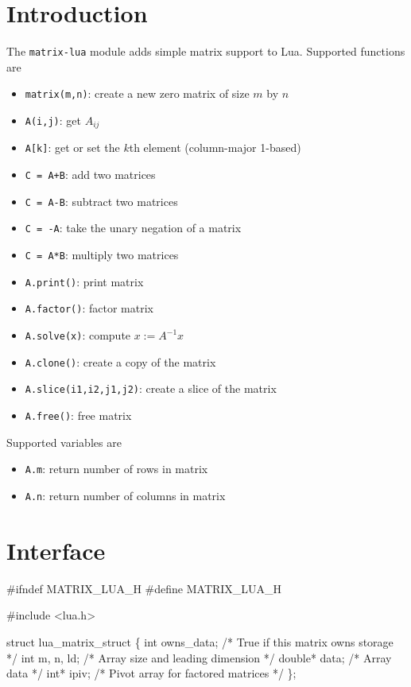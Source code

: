 
\section{Introduction}

The {\tt{}matrix-lua} module adds simple matrix support to Lua.
Supported functions are
\begin{itemize}
  \item {\tt{}matrix(m,n)}: create a new zero matrix of size $m$ by $n$
  \item {\tt{}A(i,j)}:      get $A_{ij}$
  \item {\tt{}A[k]}:        get or set the $k$th element (column-major 1-based)
  \item {\tt{}C\ =\ A+B}:     add two matrices
  \item {\tt{}C\ =\ A-B}:     subtract two matrices
  \item {\tt{}C\ =\ -A}:      take the unary negation of a matrix
  \item {\tt{}C\ =\ A*B}:     multiply two matrices
  \item {\tt{}A.print()}:   print matrix
  \item {\tt{}A.factor()}:  factor matrix
  \item {\tt{}A.solve(x)}:  compute $x := A^{-1}x$
  \item {\tt{}A.clone()}:   create a copy of the matrix
  \item {\tt{}A.slice(i1,i2,j1,j2)}:   create a slice of the matrix
  \item {\tt{}A.free()}:    free matrix
\end{itemize}
Supported variables are
\begin{itemize}
  \item {\tt{}A.m}:  return number of rows in matrix
  \item {\tt{}A.n}:  return number of columns in matrix
\end{itemize}


\section{Interface}

\endmoddef
#ifndef MATRIX_LUA_H
#define MATRIX_LUA_H 

#include <lua.h>

struct lua_matrix_struct \{
    int owns_data;  /* True if this matrix owns storage  */
    int m, n, ld;   /* Array size and leading dimension  */
    double* data;   /* Array data                        */
    int* ipiv;      /* Pivot array for factored matrices */
\};


